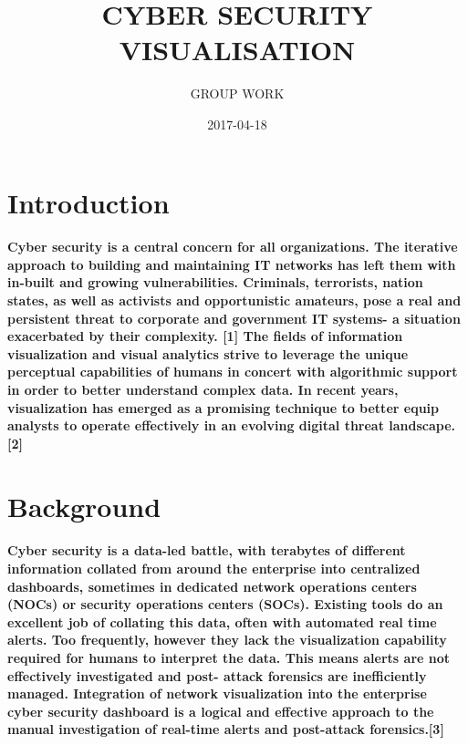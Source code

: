 \documentclass[12pt]{report}
\title{CYBER SECURITY VISUALISATION}
\author{GROUP WORK}
\date{2017-04-18}
\begin{document}
\maketitle

\section{Introduction}
\paragraph{Cyber security is a central concern for all organizations. The iterative approach to building and maintaining IT networks has left them with in-built and growing vulnerabilities. Criminals, terrorists, nation states, as well as activists and opportunistic amateurs, pose a real and persistent threat to corporate and government IT systems- a situation exacerbated by their complexity. [1] 
The fields of information visualization and visual analytics strive to leverage the unique perceptual capabilities of humans in concert with algorithmic support in order to better understand complex data. In recent years, visualization has emerged as a promising technique to better equip analysts to operate effectively in an evolving digital threat landscape. [2]
}

\section{Background}
\paragraph{Cyber security is a data-led battle, with terabytes of different information collated from around the enterprise into centralized dashboards, sometimes in dedicated network operations centers (NOCs) or security operations centers (SOCs). Existing tools do an excellent job of collating this data, often with automated real time alerts. Too frequently, however they lack the visualization capability required for humans to interpret the data. This means alerts are not effectively investigated and post- attack forensics are inefficiently managed. Integration of network visualization into the enterprise cyber security dashboard is a logical and effective approach to the manual investigation of real-time alerts and post-attack forensics.[3] }
\end{document}
